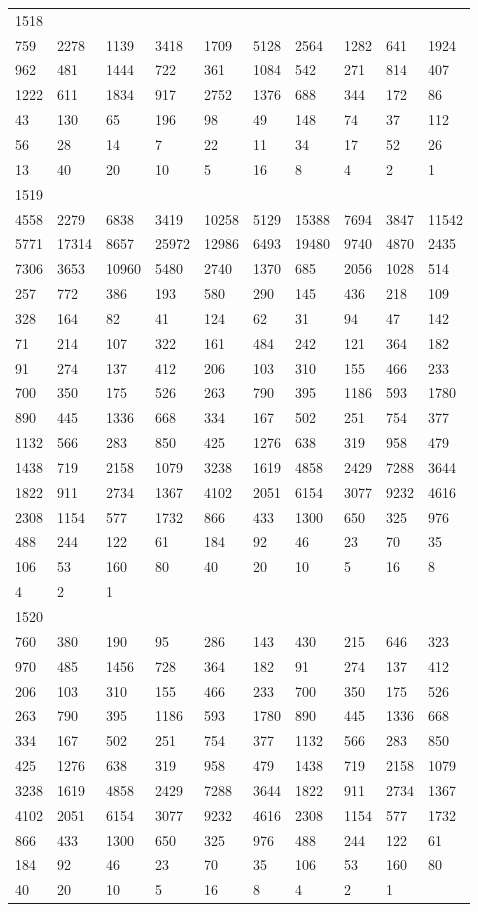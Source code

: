 \begin{longtable}{*{10}{l}}
1518&&&&&&&&&\\
759& 2278& 1139& 3418& 1709& 5128& 2564& 1282& 641& 1924\\
962& 481& 1444& 722& 361& 1084& 542& 271& 814& 407\\
1222& 611& 1834& 917& 2752& 1376& 688& 344& 172& 86\\
43& 130& 65& 196& 98& 49& 148& 74& 37& 112\\
56& 28& 14& 7& 22& 11& 34& 17& 52& 26\\
13& 40& 20& 10& 5& 16& 8& 4& 2& 1\\

1519&&&&&&&&&\\
4558& 2279& 6838& 3419& 10258& 5129& 15388& 7694& 3847& 11542\\
5771& 17314& 8657& 25972& 12986& 6493& 19480& 9740& 4870& 2435\\
7306& 3653& 10960& 5480& 2740& 1370& 685& 2056& 1028& 514\\
257& 772& 386& 193& 580& 290& 145& 436& 218& 109\\
328& 164& 82& 41& 124& 62& 31& 94& 47& 142\\
71& 214& 107& 322& 161& 484& 242& 121& 364& 182\\
91& 274& 137& 412& 206& 103& 310& 155& 466& 233\\
700& 350& 175& 526& 263& 790& 395& 1186& 593& 1780\\
890& 445& 1336& 668& 334& 167& 502& 251& 754& 377\\
1132& 566& 283& 850& 425& 1276& 638& 319& 958& 479\\
1438& 719& 2158& 1079& 3238& 1619& 4858& 2429& 7288& 3644\\
1822& 911& 2734& 1367& 4102& 2051& 6154& 3077& 9232& 4616\\
2308& 1154& 577& 1732& 866& 433& 1300& 650& 325& 976\\
488& 244& 122& 61& 184& 92& 46& 23& 70& 35\\
106& 53& 160& 80& 40& 20& 10& 5& 16& 8\\
4& 2& 1& \\

1520&&&&&&&&&\\
760& 380& 190& 95& 286& 143& 430& 215& 646& 323\\
970& 485& 1456& 728& 364& 182& 91& 274& 137& 412\\
206& 103& 310& 155& 466& 233& 700& 350& 175& 526\\
263& 790& 395& 1186& 593& 1780& 890& 445& 1336& 668\\
334& 167& 502& 251& 754& 377& 1132& 566& 283& 850\\
425& 1276& 638& 319& 958& 479& 1438& 719& 2158& 1079\\
3238& 1619& 4858& 2429& 7288& 3644& 1822& 911& 2734& 1367\\
4102& 2051& 6154& 3077& 9232& 4616& 2308& 1154& 577& 1732\\
866& 433& 1300& 650& 325& 976& 488& 244& 122& 61\\
184& 92& 46& 23& 70& 35& 106& 53& 160& 80\\
40& 20& 10& 5& 16& 8& 4& 2& 1& \\


\end{longtable}
